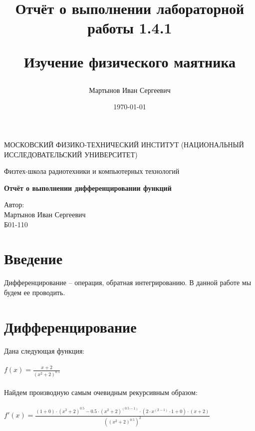 \documentclass[a4paper,12pt]{article} %
\author{Мартынов Иван Сергеевич}
\title{ Отчёт о выполнении лабораторной работы 1.4.1

Изучение физического маятника
}
\date{\today}
\begin{document}
\begin{titlepage}
\begin{center}
{\large МОСКОВСКИЙ ФИЗИКО-ТЕХНИЧЕСКИЙ ИНСТИТУТ (НАЦИОНАЛЬНЫЙ ИССЛЕДОВАТЕЛЬСКИЙ УНИВЕРСИТЕТ)}
\end{center}
\begin{center}
{\large Физтех-школа радиотехники и компьютерных технологий}
\end{center}


\vspace{4.5cm}
{\huge
\begin{center}
{\bf Отчёт о выполнении дифференцировании функций}
\end{center}
}
\vspace{2cm}
\begin{center}
{\LARGE Автор:\\ Мартынов Иван Сергеевич \\
\vspace{0.2cm}
Б01-110}
\end{center}
\end{titlepage}


\section{Введение}

Дифференцирование -- операция, обратная интегрированию. В данной работе мы будем ее проводить.

\section{Дифференцирование}

Дана следующая функция:\\ 
 \hspace{1cm}\\ 
 

$ f(x) =  \frac{ {x} + {2} }{  {\left( {x} ^ {{2}} + {2} \right)}  ^ {{0.5}} }  $\\ 
 \hspace{1cm}\\ 
 

Найдем производную самым очевидным рекурсивным образом:\\ 
 \hspace{1cm}\\ 
 

$ f'(x) =  \frac{  {\left( {1} + {0} \right)}  \cdot  {\left( {x} ^ {{2}} + {2} \right)}  ^ {{0.5}} - {0.5} \cdot  {\left( {x} ^ {{2}} + {2} \right)}  ^ { {\left( {0.5} - {1} \right)} } \cdot  {\left( {2} \cdot {x} ^ { {\left( {2} - {1} \right)} } \cdot {1} + {0} \right)}  \cdot  {\left( {x} + {2} \right)}  }{  {\left(  {\left( {x} ^ {{2}} + {2} \right)}  ^ {{0.5}} \right)}  ^ {{2}} }  $\\ 
 \hspace{1cm}\\ 
 
\end{document}
